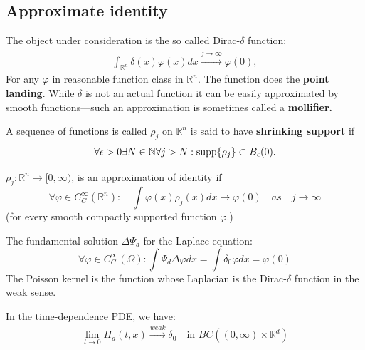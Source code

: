 \subsection{Approximate identity}
The object under consideration is the so called Dirac-$\delta$ function:
\begin{align*}
	\int_{\mathbb{R}^n} \delta(x) \varphi(x) dx \overset{j \rightarrow \infty}{\longrightarrow} \varphi(0),
\end{align*}
For any $\varphi$ in reasonable function class in $\mathbb{R}^n$. The function does the \textbf{point landing}. While $\delta$ is not an actual function it can be easily approximated by smooth functions---such an approximation is sometimes called a \textbf{mollifier.}

\begin{definition}
	A sequence of functions is called $\rho_j$ on $\mathbb{R}^n$ is said to have \textbf{shrinking support} if 
	\begin{align*}
		\forall \epsilon > 0 \exists N \in \mathbb{N} \forall j > N: \operatorname*{supp}\{\rho_j\} \subset B_\epsilon(0). 
	\end{align*}
\end{definition}

\begin{definition}
$\rho_j: \mathbb{R}^n \rightarrow [0, \infty)$, is an approximation of identity if
	\begin{equation}
	 	\forall \varphi \in C^\infty_C(\mathbb{R}^n):\quad	\int \varphi(x) \rho_j(x) dx \rightarrow \varphi(0) \quad as \quad j \rightarrow \infty 
	\end{equation}
	(for every smooth compactly supported function $\varphi$.) 
\end{definition}


\begin{example}
The fundamental solution $\Delta \Psi_d$ for the Laplace equation:
\begin{equation*}
	\forall \varphi \in C^\infty_C(\Omega):  \int \Psi_d \Delta \varphi dx = \int \delta_0 \varphi dx = \varphi(0)
\end{equation*} 	
The Poisson kernel is the function whose Laplacian is the Dirac-$\delta$ function in the weak sense.
\end{example}

\begin{example}
	In the time-dependence PDE, we have:
	\begin{align*}
		\lim_{t \rightarrow 0} H_d(t, x) \overset{weak}{\rightarrow} \delta_0 \quad \text{in } BC((0, \infty) \times \mathbb{R}^d)
	\end{align*}
\end{example}

